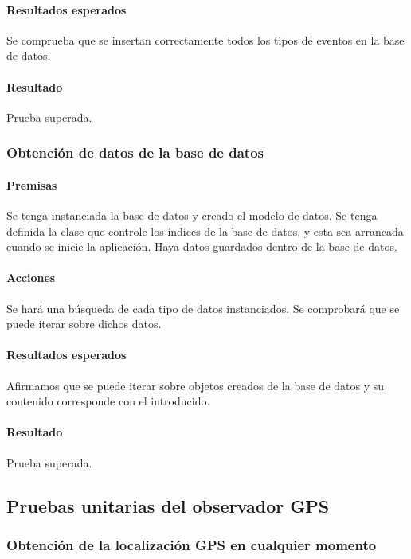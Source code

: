 \paragraph{Resultados esperados}

Se comprueba que se insertan correctamente todos los tipos de eventos en la base de datos.

\paragraph{Resultado}
Prueba superada.

\subsubsection{Obtención de datos de la base de datos}

\paragraph{Premisas}
Se tenga instanciada la base de datos y creado el modelo de datos.
Se tenga definida la clase que controle los índices de la base de datos, y esta sea arrancada cuando se inicie la aplicación.
Haya datos guardados dentro de la base de datos.

\paragraph{Acciones}
Se hará una búsqueda de cada tipo de datos instanciados.
Se comprobará que se puede iterar sobre dichos datos.

\paragraph{Resultados esperados}

Afirmamos que se puede iterar sobre objetos creados de la base de datos y su contenido corresponde con el introducido.

\paragraph{Resultado}
Prueba superada.

\subsection{Pruebas unitarias del observador GPS}

\subsubsection{Obtención de la localización GPS en cualquier momento}

